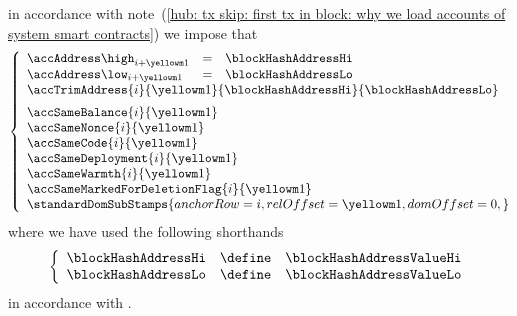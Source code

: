 \item[\underline{Loading the \inst{BLOCKHASH} system smart contract:}] 
	in accordance with
	note~(\ref{hub: tx skip: first tx in block: why we load accounts of system smart contracts})
	we impose that
	\[
		\left\{ \begin{array}{lclr}
			\accAddress  \high _{i + \roffTxSkipSysiBlockHashSystemContractAccount} & = & \blockHashAddressHi \\
			\accAddress  \low  _{i + \roffTxSkipSysiBlockHashSystemContractAccount} & = & \blockHashAddressLo \\
			\multicolumn{4}{l}{
				\accTrimAddress
				{i}{\roffTxSkipSysiBlockHashSystemContractAccount}
				{\blockHashAddressHi}
				{\blockHashAddressLo}} \vspace{2mm} \\
			\multicolumn{3}{l}{\accSameBalance                       {i}{\roffTxSkipSysiBlockHashSystemContractAccount}} \\
			\multicolumn{3}{l}{\accSameNonce                         {i}{\roffTxSkipSysiBlockHashSystemContractAccount}} \\
			\multicolumn{3}{l}{\accSameCode                          {i}{\roffTxSkipSysiBlockHashSystemContractAccount}} \\
			\multicolumn{3}{l}{\accSameDeployment                    {i}{\roffTxSkipSysiBlockHashSystemContractAccount}} \\
			\multicolumn{3}{l}{\accSameWarmth                        {i}{\roffTxSkipSysiBlockHashSystemContractAccount}} \\
			\multicolumn{3}{l}{\accSameMarkedForDeletionFlag         {i}{\roffTxSkipSysiBlockHashSystemContractAccount}} \\
			\multicolumn{3}{l}{
				\standardDomSubStamps {
					anchorRow = i                                              ,
					relOffset = \roffTxSkipSysiBlockHashSystemContractAccount ,
					domOffset = 0                                              ,
				}
			} \\
		\end{array} \right.
	\]
	where we have used the following shorthands
	\[
		\left\{ \begin{array}{lcl}
			\blockHashAddressHi & \define & \blockHashAddressValueHi \\
			\blockHashAddressLo & \define & \blockHashAddressValueLo \\
		\end{array} \right.
	\]
	in accordance with \cite{EIP-4788}.
